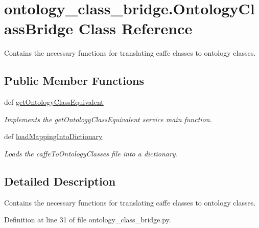 \hypertarget{classontology__class__bridge_1_1OntologyClassBridge}{\section{ontology\-\_\-class\-\_\-bridge.\-Ontology\-Class\-Bridge Class Reference}
\label{classontology__class__bridge_1_1OntologyClassBridge}
}


Contains the necessary functions for translating caffe classes to ontology classes.  


\subsection*{Public Member Functions}
\begin{DoxyCompactItemize}
\item 
def \hyperlink{classontology__class__bridge_1_1OntologyClassBridge_a22042f0ef1647534d565a02ab755aacb}{get\-Ontology\-Class\-Equivalent}
\begin{DoxyCompactList}\small\item\em Implements the get\-Ontology\-Class\-Equivalent service main function. \end{DoxyCompactList}\item 
def \hyperlink{classontology__class__bridge_1_1OntologyClassBridge_a10928b79bc77051cff4b2715b4cee9dc}{load\-Mapping\-Into\-Dictionary}
\begin{DoxyCompactList}\small\item\em Loads the caffe\-To\-Ontology\-Classes file into a dictionary. \end{DoxyCompactList}\end{DoxyCompactItemize}


\subsection{Detailed Description}
Contains the necessary functions for translating caffe classes to ontology classes. 

Definition at line 31 of file ontology\-\_\-class\-\_\-bridge.\-py.



